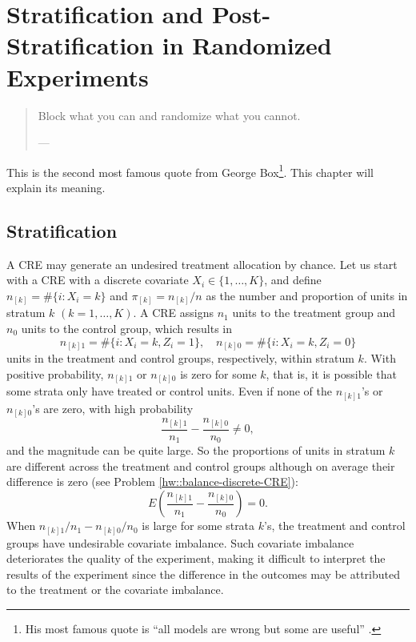 
\chapter{Stratification and Post-Stratification in Randomized Experiments}
\label{chapter::stratification-poststratification}

\begin{quotation}
Block what you can and randomize what you cannot.  

--- \citet[][page 103]{box1978statistics}
\end{quotation}

This is the second most famous quote from George Box\footnote{His most famous quote is ``all models are wrong but some are useful'' \citep[][page 202]{box1979robustness}.}. This chapter will explain its meaning.



\section{Stratification}



A CRE may generate an undesired treatment allocation by chance. Let us start with a CRE with a discrete covariate $X_i   \in \{ 1, \ldots, K \}$, and define $n_{[k]} = \#\{ i: X_i    =k  \}$ and $\pi_{[k]} = n_{[k]} / n$ as the number and proportion of units  in stratum $k$ $(k=1, \ldots, K)$. A CRE assigns $n_1$ units to the treatment group and $n_0$ units to the control group, which results in 
$$
n_{[k]1} = \#\{ i: X_i   = k, Z_i = 1 \},\quad
n_{[k]0} = \#\{ i: X_i   = k, Z_i = 0 \}
$$
units in the treatment and control groups, respectively, within stratum $k$. With positive probability, $n_{[k]1}$ or $n_{[k]0}$ is zero for some $k$, that is, it is possible that some strata only have treated or control units. Even if none of the $n_{[k]1}$'s or $n_{[k]0}$'s are zero, with high probability 
\begin{equation}
\frac{  n_{[k]1} }{n_1}  -  \frac{  n_{[k]0} }{n_0} \neq 0 ,
\label{eq::covarianceimbK}
\end{equation} 
and the magnitude can be quite large. So  the proportions of units in stratum $k$ are different across the treatment and control groups although on average their difference is zero (see Problem \ref{hw::balance-discrete-CRE}):
\begin{equation}\label{eq::balance-discrete-CRE}
E\left(  \frac{  n_{[k]1} }{n_1}  -  \frac{  n_{[k]0} }{n_0} \right) = 0.
\end{equation}
When $n_{[k]1}  / n_1  -  n_{[k]0} / n_0$ is large for some strata $k$'s, the treatment and control groups have undesirable covariate imbalance. Such covariate imbalance deteriorates the quality of the experiment, making it difficult to interpret the results of the experiment since the difference in the outcomes may be attributed to the treatment or the covariate imbalance. 



